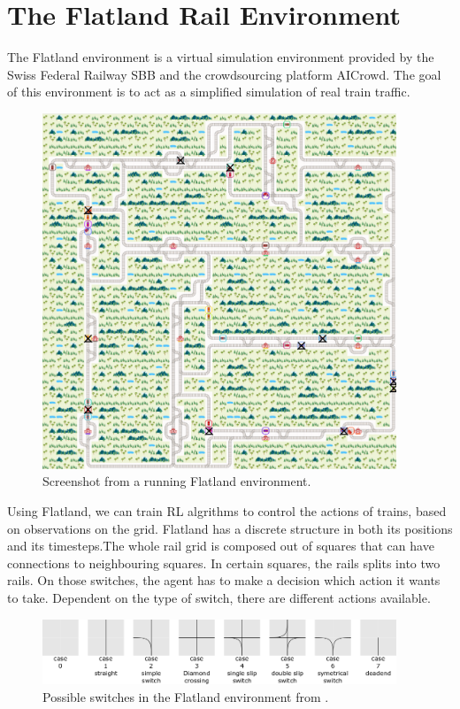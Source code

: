 \section{The Flatland Rail Environment}\label{flatland_intro}
The Flatland environment is a virtual simulation environment provided by the Swiss Federal Railway SBB and the crowdsourcing platform AICrowd.
The goal of this environment is to act as a simplified simulation of real train traffic.
\begin{figure}
	\centering
	\includegraphics[width=300pt]{images/screenshot_flatland.png}
	\caption{Screenshot from a running Flatland environment.}
\end{figure}
Using Flatland, we can train RL algrithms to control the actions of trains, based on observations on the grid. Flatland has a discrete structure in both its positions and its timesteps.The whole rail grid is composed out of squares that can have connections to neighbouring squares. In certain squares, the rails splits into two rails. On those switches, the agent has to make a decision which action it wants to take. Dependent on the type of switch, there are different actions available.
\begin{figure}
	\centering
	\includegraphics[width=300pt]{images/transition_nips_proposal.png}
	\caption{Possible switches in the Flatland environment from \cite{flatland_docu}.}
\end{figure}
